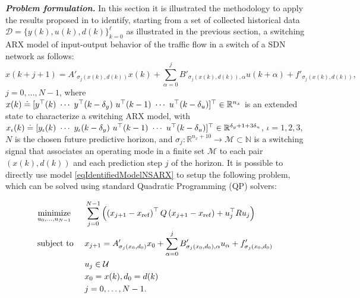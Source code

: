 \textbf{\emph{Problem formulation.}} In this section it is illustrated the methodology to apply the results proposed in \cite{SmarraADHS2018,smarraNAHS2020} to identify, starting from a set of collected historical data $ \mathcal{D}=\{y(k),u(k),d(k)\}_{k = 0}^{\ell} $ as illustrated in the previous section, a switching ARX model of input-output behavior of the traffic flow in a switch of a SDN network as follows:
\small
\begin{equation}\label{eqIdentifiedModelNSARX}
x(k+j+1) =	A'_{\sigma_j(x(k),d(k))} x(k) + \sum_{\alpha = 0}^{j}B'_{\sigma_{j}(x(k),d(k)),\alpha} u(k+\alpha) + f'_{\sigma_j(x(k),d(k))},
\end{equation}
\normalsize
\noindent $j = 0,\ldots, N-1$, where $x(k) \doteq [y^\top(k)\ \cdots\ y^\top(k-\delta_y)\ u^\top(k-1)\ \cdots\ u^\top(k-\delta_u)]^\top\in\Real^{n_x}$ is an extended state to characterize a switching ARX model, with $x_\iota(k) \doteq [y_\iota(k)\ \cdots\ y_\iota(k-\delta_y)\ u^\top(k-1)\ \cdots\ u^\top(k-\delta_u)]^\top\in\Real^{\delta_y+1+3\delta_u}$, $\iota = 1,2,3$, $N$ is the chosen future predictive horizon, and  $\sigma_j : \mathbb{R}^{n_x+10} \to \mathcal M \subset \mathbb{N}$ is a switching signal that associates an operating mode in a finite set $\mathcal M$ to each pair $(x(k),d(k))$ and each prediction step $j$ of the horizon.
It is possible to directly use model \eqref{eqIdentifiedModelNSARX} to setup the following problem, which can be solved using standard Quadratic Programming (QP) solvers:\\
\begin{problem}\label{pbMPCSwitching}
	\small
	\vspace{-0.3cm}
	\begin{equation*}
		\begin{aligned}
			& \underset{u_0,\ldots,u_{N-1}}{\text{minimize}} & &  \sum_{j=0}^{N-1} \left(\left(x_{j+1}-x_{\mathrm{ref}}\right)^\top Q \left(x_{j+1}-x_{\mathrm{ref}}\right) + u^\top_{j} R u_{j}\right)\\
			& \text{subject to }            & &  x_{j+1} = A'_{\sigma_j(x_{0},d_{0})} x_0 + \sum_{\alpha = 0}^{j}B'_{\sigma_{j}(x_{0},d_{0}),\alpha} u_\alpha + f'_{\sigma_j(x_{0},d_{0})}\\       
			&                               & &  u_{j}   \in \mathcal{U}\\
			&                               & &  x_{0} = x(k), d_{0} = d(k)\\ 
			&                               & &  j = 0,\ldots,N-1.			\\
		\end{aligned}
		\vspace{0.1cm}
	\end{equation*}
	\normalsize
\end{problem}
